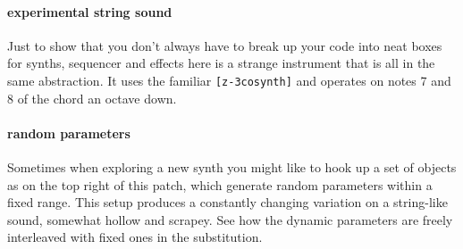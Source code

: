 \paragraph{experimental string sound}
Just to show that you don't always have to break up your code into
neat boxes for synths, sequencer and effects here is a strange
instrument that is all in the same abstraction. It uses the familiar
\verb+[z-3cosynth]+ and operates on notes 7 and 8 of the chord an
octave down. 

\paragraph{random parameters}
Sometimes when exploring a new synth you might like to hook up
a set of objects as on the top right of this patch, which generate
random parameters within a fixed range. This setup produces
a constantly changing variation on a string-like sound, somewhat
hollow and scrapey. See how the dynamic parameters are freely interleaved with fixed
ones in the substitution.